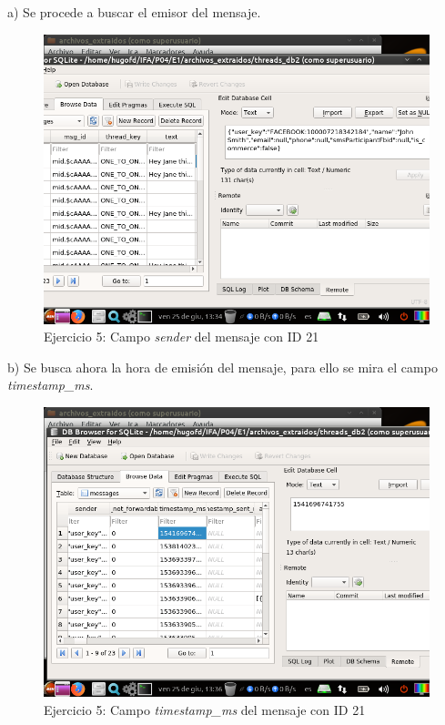 \documentclass[11pt]{article}
\begin{document}
a) Se procede a buscar el emisor del mensaje.

\begin{figure}[H]
    \caption{Ejercicio 5: Campo \textit{sender} del mensaje con ID 21}
    \centering
    \includegraphics[scale=0.7]{e5-1.png}
\end{figure}

b) Se busca ahora la hora de emisión del mensaje, para ello se mira el campo \textit{timestamp\_ms}.

\begin{figure}[H]
    \caption{Ejercicio 5: Campo \textit{timestamp\_ms} del mensaje con ID 21}
    \centering
    \includegraphics[scale=0.7]{e5-2.png}
\end{figure}
\end{document}

